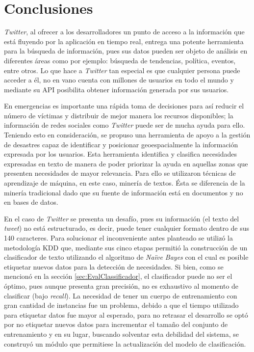 \chapter{Conclusiones}
\label{cap:conclusiones}

\textit{Twitter}, al ofrecer a los desarrolladores un punto de acceso a la información que está fluyendo por la aplicación en tiempo real, entrega una potente herramienta para la búsqueda de información, pues sus datos pueden ser objeto de análisis en diferentes áreas como por ejemplo: búsqueda de tendencias, política, eventos, entre otros. Lo que hace a \textit{Twitter} tan especial es que cualquier persona puede acceder a él, no en vano cuenta con millones de usuarios en todo el mundo y mediante su API posibilita obtener información generada por sus usuarios. 

En emergencias es importante una rápida toma de decisiones para así reducir el número de víctimas y distribuir de mejor manera los recursos disponibles; la información de redes sociales como \textit{Twitter} puede ser de mucha ayuda para ello. Teniendo esto en consideración, se propuso una herramienta de apoyo a la gestión de desastres capaz de identificar y posicionar geoespacialmente la información expresada por los usuarios. Esta herramienta identifica y clasifica necesidades expresadas en texto de manera de poder priorizar la ayuda en aquellas zonas que presenten necesidades de mayor relevancia. Para ello se utilizaron técnicas de aprendizaje de máquina, en este caso, minería de textos. Ésta se diferencia de la minería tradicional dado que su fuente de información está en documentos y no en bases de datos. 

En el caso de \textit{Twitter} se presenta un desafío, pues su información (el texto del \textit{tweet}) no está estructurado, es decir, puede tener cualquier formato dentro de sus 140 caracteres. Para solucionar el inconveniente antes planteado se utilizó la metodología KDD que, mediante sus cinco etapas permitió la construcción de un clasificador de texto utilizando el algoritmo de \textit{Naïve Bayes} con el cual es posible etiquetar nuevos datos para la detección de necesidades. Si bien, como se mencionó en la sección \ref{sec:EvalClassificador}, el clasificador puede no ser el óptimo, pues aunque presenta gran precisión, no es exhaustivo al momento de clasificar (bajo \textit{recall}). La necesidad de tener un cuerpo de entrenamiento con gran cantidad de instancias fue un problema, debido a que el tiempo utilizado para etiquetar datos fue mayor al esperado, para no retrasar el desarrollo se optó por no etiquetar nuevos datos para incrementar el tamaño del conjunto de entrenamiento y en su lugar, buscando solventar esta debilidad del sistema, se construyó un módulo que permitiese la actualización del modelo de clasificación.


